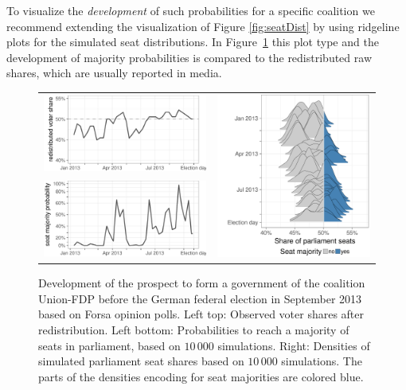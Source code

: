 \documentclass[smallcondensed]{svjour3}     %
\begin{document}
To visualize the {\it development} of such probabilities
for a specific coalition we recommend extending the visualization of Figure \ref{fig:seatDist} by using ridgeline plots \citep{wilke_2017} for the simulated seat distributions. In Figure~\ref{fig:seatDist_time} this plot type and the development of majority probabilities is compared to
the redistributed raw shares, which are usually reported in media.

\begin{figure}[H]\centering
\begin{tabular}{ll}
\includegraphics[height=.15\textwidth]{figures/2013_forsa_cdufdp_rawSharesRedist.pdf}
&
\multirow{2}{*}[13ex]{\includegraphics[height=30ex]{figures/2013_forsa_cdufdp_ridgeline.pdf}}
\\
\includegraphics[height=.15\textwidth]{figures/2013_forsa_cdufdp_prob.pdf}
\end{tabular}
\caption{Development of the prospect to form a government of the coalition Union-FDP before the German federal election in September 2013 based on Forsa opinion polls.
Left top: Observed voter shares after redistribution. Left bottom: Probabilities to reach a majority of seats in parliament, based on $10\,000$ simulations. Right: Densities of simulated parliament seat shares based on $10\,000$ simulations. The parts of the densities encoding for seat majorities are colored blue.
\label{fig:seatDist_time}
}
\end{figure}
\end{document}
